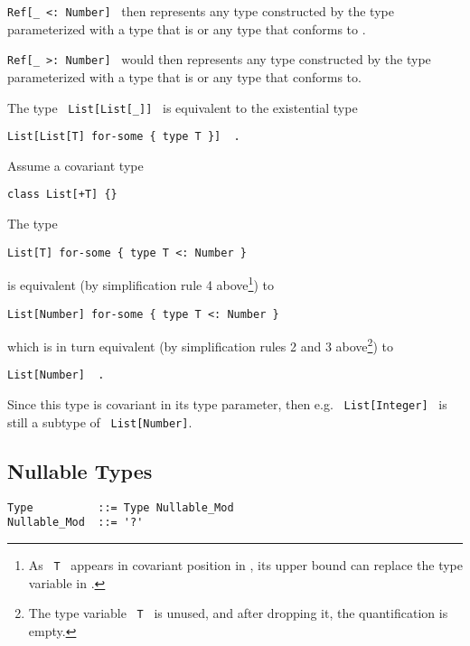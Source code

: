 \lstinline!Ref[_ <: Number]!~ then represents any type constructed by the type parameterized with a type that is  or any type that conforms to . 

\lstinline!Ref[_ >: Number]!~ would then represents any type constructed by the type  parameterized with a type that is  or any type that  conforms to. 

\example The type ~\lstinline!List[List[_]]!~ is equivalent to the existential type
\begin{lstlisting}
List[List[T] for-some { type T }]  .
\end{lstlisting}

\example Assume a covariant type
\begin{lstlisting}
class List[+T] {}
\end{lstlisting}

The type 
\begin{lstlisting}
List[T] for-some { type T <: Number }
\end{lstlisting}

is equivalent (by simplification rule 4 above\footnote{As ~\lstinline!T!~ appears in covariant position in , its upper bound can replace the type variable in .}) to
\begin{lstlisting}
List[Number] for-some { type T <: Number }
\end{lstlisting}

which is in turn equivalent (by simplification rules 2 and 3 above\footnote{The type variable ~\lstinline!T!~ is unused, and after dropping it, the quantification is empty.}) to
\begin{lstlisting}
List[Number]  .
\end{lstlisting}

Since this  type is covariant in its type parameter, then e.g. ~\lstinline!List[Integer]!~ is still a subtype of ~\lstinline!List[Number]!. 





\subsection{Nullable Types}
\label{sec:nullable-types}

\syntax\begin{lstlisting}
Type          ::= Type Nullable_Mod
Nullable_Mod  ::= '?'
\end{lstlisting}

